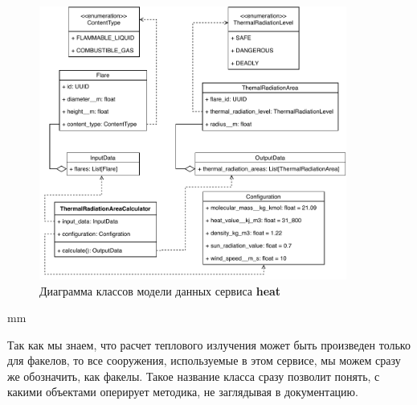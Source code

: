 \begin{figure}[H]
	\hspace*{-2.5 cm}\includegraphics[width=0.9\textwidth]{implementation/pictures/math/classes}
	\caption{Диаграмма классов модели данных сервиса \textbf{heat}}
	\label{pic:implementation__math-classes}
\end{figure}
 mm

Так как мы знаем, что расчет теплового излучения может быть произведен только для факелов, то все сооружения,
используемые в этом сервисе, мы можем сразу же обозначить, как факелы. Такое название класса сразу позволит
понять, с какими объектами оперирует методика, не заглядывая в документацию.